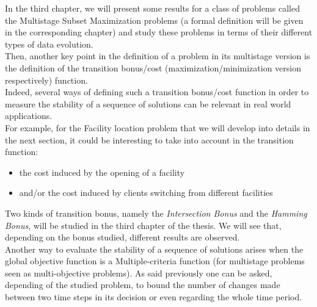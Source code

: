 \documentclass[a4paper]{book}
\begin{document}

In the third chapter, we will present some results for a class of problems called the {\sc Multistage Subset Maximization} problems (a formal definition will be given in the corresponding chapter) and study these problems in terms of their different types of data evolution. \\

Then, another key point in the definition of a problem in its multistage version is the definition of the transition bonus/cost (maximization/minimization version respectively) function.\\
Indeed, several ways of defining such a transition bonus/cost function in order to measure the stability of a sequence of solutions can be relevant in real world applications. \\
For example, for the {\sc Facility location} problem that we will develop into details in the next section, it could be interesting to take into account in the transition function:
\begin{itemize}
    \item the cost induced by the opening of a facility
    \item and/or the cost induced by clients switching from different facilities
\end{itemize} 
Two kinds of transition bonus, namely the \emph{Intersection Bonus} and the \emph{Hamming Bonus}, will be studied in the third chapter of the thesis. We will see that, depending on the bonus studied, different results are observed.\\
Another way to evaluate the stability of a sequence of solutions arises when the global objective function is a Multiple-criteria function (for multistage problems seen as multi-objective problems). As said previously one can be asked, depending of the studied problem, to bound the number of changes made between two time steps in its decision or even regarding the whole time period.\\
\end{document}

